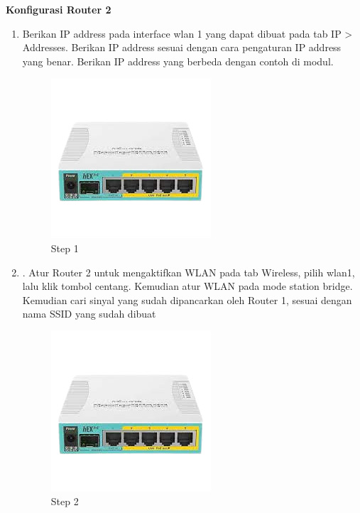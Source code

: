 \begin{center} 
	\textbf{Konfigurasi Router 2}
\end{center}

\begin{enumerate}
	\item Berikan IP address pada interface wlan 1 yang dapat dibuat pada tab IP > Addresses. Berikan
	IP address sesuai dengan cara pengaturan IP address yang benar. Berikan IP address yang
	berbeda dengan contoh di modul.
	\begin{figure}[H]
		\centering
		\includegraphics[width=0.5\linewidth]{P1/img/contoh.png}
		\caption{Step 1}
		\label{fig:gambar12}
	\end{figure}

	\item . Atur Router 2 untuk mengaktifkan WLAN pada tab Wireless, pilih wlan1, lalu klik tombol centang. 
	Kemudian atur WLAN pada mode station bridge. Kemudian cari sinyal yang sudah dipancarkan
	oleh Router 1, sesuai dengan nama SSID yang sudah dibuat
	
	\begin{figure}[H]
		\centering
		\includegraphics[width=0.5\linewidth]{P1/img/contoh.png}
		\caption{Step 2}
		\label{fig:gambar13}
	\end{figure}

\end{enumerate}

